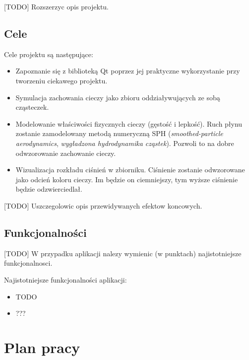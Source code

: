 \documentclass[a4paper]{article}
\begin{document}
[TODO] Rozszerzyc opis projektu.

\subsection{Cele}
Cele projektu są następujące:
\begin{itemize}
  \item Zapoznanie się z biblioteką Qt poprzez jej praktyczne wykorzystanie przy tworzeniu ciekawego projektu.
  \item Symulacja zachowania cieczy jako zbioru oddziaływujących ze sobą cząsteczek.
  \item Modelowanie właściwości fizycznych cieczy (gęstość i lepkość). 
        Ruch płynu zostanie zamodelowany metodą numeryczną SPH (\textit{smoothed-particle aerodynamics}, \textit{wygładzona hydrodynamika cząstek}).
        Pozwoli to na dobre odwzorowanie zachowanie cieczy.
  \item Wizualizacja rozkładu ciśnień w zbiorniku. 
        Ciśnienie zostanie odwzorowane jako odcień koloru cieczy.
        Im będzie on ciemniejszy, tym wyższe ciśnienie będzie odzwierciedlał.
\end{itemize}

[TODO] Uszczegolowic opis przewidywanych efektow koncowych.

\subsection{Funkcjonalności}
[TODO] W przypadku aplikacji nalezy wymienic (w punktach) najistotniejsze funkcjonalnosci.

Najistotniejsze funkcjonalności aplikacji:
\begin{itemize}
  \item TODO
  \item ???
\end{itemize}

\section{Plan pracy}
\end{document}
